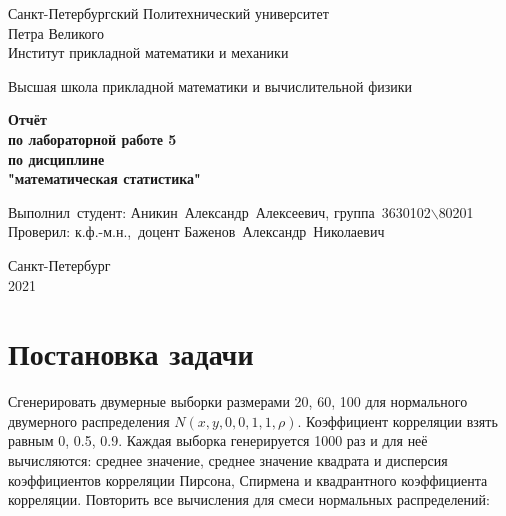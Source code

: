 \documentclass[12pt,a4paper]{article}
\begin{document}
	
	\begin{titlepage}
		
		\begin{center}
			\begin{large}
				Санкт-Петербургский Политехнический университет\\ Петра Великого\\
				Институт прикладной математики и механики\\
			\end{large}
			\vspace{0.2cm}
			Высшая школа прикладной математики и вычислительной физики\\
			
		\end{center}
		
		\vspace{3cm}
		\begin{center}
			\textbf{Отчёт\\ по лабораторной работе 5\\ по дисциплине\\ "математическая статистика"}
		\end{center}
		
		\vspace{3cm}
		\vbox{%
			\hfill%
			\vbox{%
				\hbox{Выполнил студент:}%
				\hbox{\break}
				\hbox{Аникин Александр Алексеевич,}%
				\hbox{группа 3630102$\backslash$80201}%
				\hbox{\break}
				\hbox{\break}
				\hbox{Проверил:}
				\hbox{\break}
				\hbox{к.ф.-м.н., доцент}
				\hbox{Баженов Александр Николаевич}
			}%
		} 
		\vfill
		
		\begin{center}
			Санкт-Петербург\\2021
		\end{center}
		
	\end{titlepage}
	\tableofcontents
	\newpage
	
	\listoffigures
	\newpage
	
	\listoftables
	\newpage	
	
	\section{Постановка задачи}
	Сгенерировать двумерные выборки размерами 20, 60, 100 для нормального двумерного распределения $N(x, y, 0, 0, 1, 1, \rho)$. Коэффициент корреляции взять равным 0, 0.5, 0.9. Каждая выборка генерируется 1000 раз и для неё вычисляются: среднее значение, среднее значение квадрата и дисперсия коэффициентов корреляции Пирсона, Спирмена и квадрантного коэффициента корреляции. Повторить все вычисления для смеси нормальных распределений:
	
\end{document}
